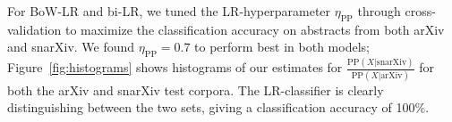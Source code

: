 \documentclass{article}
\begin{document}
For BoW-LR and bi-LR, we tuned the LR-hyperparameter $\eta_\text{PP}$ through cross-validation to maximize the classification accuracy on abstracts from both arXiv and snarXiv.
We found $\eta_{\text{PP}}=0.7$ to perform best in both models; Figure~\ref{fig:histograms} shows histograms of our estimates for $\frac{\text{PP}(X|\text{snarXiv})}{\text{PP}(X|\text{arXiv})}$ for both the arXiv and snarXiv test corpora.
The LR-classifier is clearly distinguishing between the two sets, giving a classification accuracy of 100\%.








\end{document}
